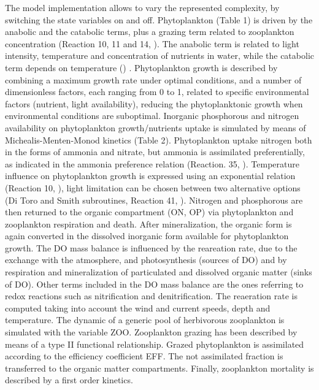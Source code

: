 The model implementation allows to vary the represented complexity, by switching the state variables on and off.
Phytoplankton (Table 1) is driven by the anabolic and the catabolic terms, plus a grazing term related to zooplankton concentration (Reaction 10, 11 and 14, \Ttwoa). The anabolic term is related to light intensity, temperature and concentration of nutrients in water, while the catabolic term depends on temperature (\Ttwoa) .
Phytoplankton growth is described by combining a maximum growth rate under optimal conditions, and a number of dimensionless factors, each ranging from 0 to 1, related to specific environmental factors (nutrient, light availability), reducing the phytoplanktonic growth when environmental conditions are suboptimal. Inorganic phosphorous and nitrogen availability on phytoplankton growth/nutrients uptake is simulated by means of Michealis-Menten-Monod kinetics (Table 2). Phytoplankton uptake nitrogen both in the forms of ammonia and nitrate, but ammonia is assimilated preferentially, as indicated in the ammonia preference relation (Reaction. 35, \Ttwoa). Temperature influence on phytoplankton growth is expressed using an exponential relation (Reaction 10, \Ttwoa), light limitation can be chosen between two alternative options (Di Toro and Smith subroutines, Reaction 41, \Ttwoa). 
Nitrogen and phosphorous are then returned to the organic compartment (ON, OP) via phytoplankton and zooplankton respiration and death. After mineralization, the organic form is again converted in the dissolved inorganic form available for phytoplankton growth. 
The DO mass balance is influenced by the reareation rate, due to the exchange with the atmosphere, and photosynthesis (sources of DO) and by respiration and mineralization of particulated and dissolved organic matter (sinks of DO). Other terms included in the DO mass balance are the ones referring to redox reactions such as nitrification and denitrification. The reaeration rate is computed taking into account the wind and current speeds, depth and temperature.
The dynamic of a generic pool of herbivorous zooplankton is simulated with the variable ZOO. Zooplankton grazing has been described by means of a type II functional relationship.
Grazed phytoplankton is assimilated according to the efficiency coefficient EFF. The not assimilated fraction is transferred to the organic matter compartments. Finally, zooplankton mortality is described by a first order kinetics. 




